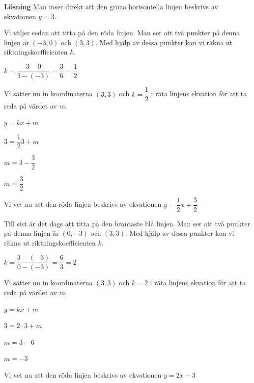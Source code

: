 \documentclass{article}
\begin{document}
\textbf{Lösning}
Man inser direkt att den gröna horisontella linjen beskrivs av ekvationen $y = 3$.

Vi väljer sedan att titta på den röda linjen. Man ser att två punkter på denna linjen är $(-3, 0)$ och $(3, 3)$. Med hjälp av dessa punkter kan vi räkna ut riktningskoefficienten $k$.

$k=\dfrac{3-0}{3-(-3)}=\dfrac{3}{6}=\dfrac{1}{2}$

Vi sätter nu in koordinaterna $(3, 3)$ och $k = \dfrac{1}{2}$ i räta linjens ekvation för att ta reda på värdet av $m$.

$y = kx + m$

$3 = \dfrac{1}{2}3 + m$

$m = 3 - \dfrac{3}{2}$

$m = \dfrac{3}{2}$

Vi vet nu att den röda linjen beskrivs av ekvationen $y = \dfrac{1}{2}x + \dfrac{3}{2}$

Till sist är det dags att titta på den brantaste blå linjen. Man ser att två punkter på denna linjen är $(0, -3)$ och $(3, 3)$. Med hjälp av dessa punkter kan vi räkna ut riktningskoefficienten $k$.

$k=\dfrac{3-(-3)}{0-(-3)}=\dfrac{6}{3}=2$

Vi sätter nu in koordinaterna $(3, 3)$ och $k = 2$ i räta linjens ekvation för att ta reda på värdet av $m$.

$y = kx + m$

$3 = 2\cdot3 + m$

$m = 3 - 6$

$m = -3$

Vi vet nu att den röda linjen beskrivs av ekvationen $y = 2x - 3$
\end{document}
